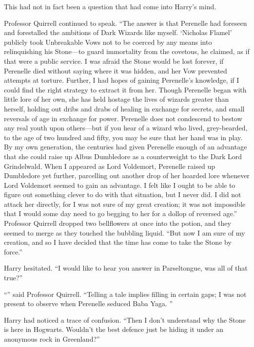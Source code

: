 This had not in fact been a question that had come into Harry’s mind.

Professor Quirrell continued to speak. “The answer is that Perenelle had foreseen and forestalled the ambitions of Dark Wizards like myself. ‘Nicholas Flamel’ publicly took Unbreakable Vows not to be coerced by any means into relinquishing his Stone—to guard immortality from the covetous, he claimed, as if that were a public service. I was afraid the Stone would be lost forever, if Perenelle died without saying where it was hidden, and her Vow prevented attempts at torture. Further, I had hopes of gaining Perenelle’s knowledge, if I could find the right strategy to extract it from her. Though Perenelle began with little lore of her own, she has held hostage the lives of wizards greater than herself, holding out dribs and drabs of healing in exchange for secrets, and small reversals of age in exchange for power. Perenelle does not condescend to bestow any real youth upon others—but if you hear of a wizard who lived, grey-bearded, to the age of two hundred and fifty, you may be sure that her hand was in play. By my own generation, the centuries had given Perenelle enough of an advantage that she could raise up Albus Dumbledore as a counterweight to the Dark Lord Grindelwald. When I appeared as Lord Voldemort, Perenelle raised up Dumbledore yet further, parcelling out another drop of her hoarded lore whenever Lord Voldemort seemed to gain an advantage. I felt like I ought to be able to figure out something clever to do with that situation, but I never did. I did not attack her directly, for I was not sure of my great creation; it was not impossible that I would some day need to go begging to her for a dollop of reversed age.” Professor Quirrell dropped two bellflowers at once into the potion, and they seemed to merge as they touched the bubbling liquid. “But now I am sure of my creation, and so I have decided that the time has come to take the Stone by force.”

Harry hesitated. “I would like to hear you answer in Parseltongue, was all of that true?”

“” said Professor Quirrell. “Telling a tale implies filling in certain gaps; I was not present to observe when Perenelle seduced Baba Yaga. ”

Harry had noticed a trace of confusion. “Then I don’t understand why the Stone is here in Hogwarts. Wouldn’t the best defence just be hiding it under an anonymous rock in Greenland?”

